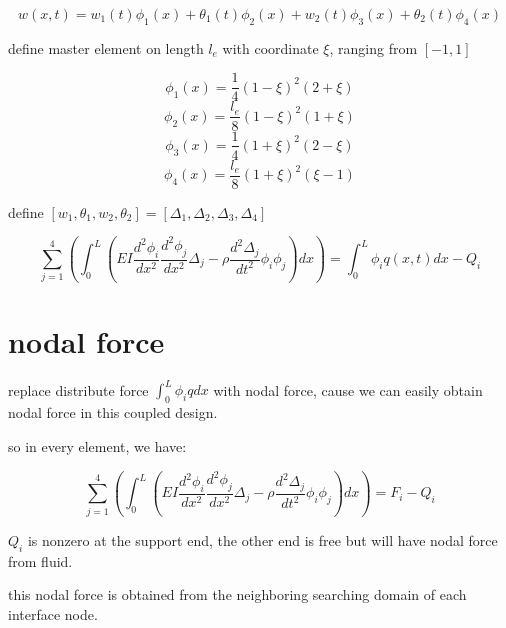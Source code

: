 \documentclass[11pt]{article}
\begin{document}
$$ w(x,t) = w_1(t) \phi_1(x) + \theta_1(t) \phi_2(x) + w_2(t) \phi_3(x) + \theta_2(t) \phi_4(x) $$

define master element on length $l_e$ with coordinate $\xi$, ranging from $[-1, 1]$

$$ \phi_1(x) = \frac{1}{4} (1-\xi)^2 (2+\xi) $$
$$ \phi_2(x) = \frac{l_e}{8}(1-\xi)^2(1+\xi) $$
$$ \phi_3(x) = \frac{1}{4} (1+\xi)^2 (2-\xi) $$
$$ \phi_4(x) = \frac{l_e}{8}(1+\xi)^2(\xi-1) $$

define $[w_1, \theta_1, w_2, \theta_2] = [ \Delta_1, \Delta_2,\Delta_3, \Delta_4] $

$$ \sum_{j=1}^4 ( \int_0^L( EI \frac{d^2 \phi_i}{dx^2} \frac{d^2 \phi_j}{dx^2}\Delta_j - \rho \frac{d^2 \Delta_j}{dt^2} \phi_i \phi_j) dx) = \int_0^L \phi_i q(x,t) dx - Q_i $$  



\section{ nodal force}

replace distribute force $\int_0^L \phi_i q dx $ with nodal force, cause we can easily obtain nodal force in this coupled design.

so in every element, we have:

$$ \sum_{j=1}^4 ( \int_0^L( EI \frac{d^2 \phi_i}{dx^2} \frac{d^2 \phi_j}{dx^2}\Delta_j - \rho \frac{d^2 \Delta_j}{dt^2} \phi_i \phi_j) dx) = F_i - Q_i $$  

$Q_i$ is nonzero at the support end, the other end is free but will have nodal force from fluid.  

this nodal force is obtained from the neighboring searching domain of each interface node.
\end{document}
